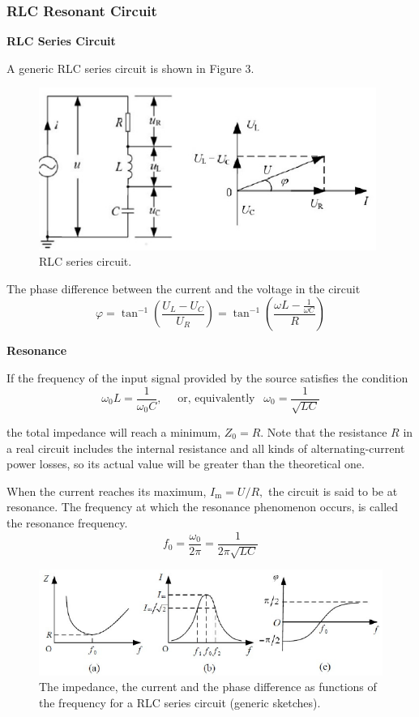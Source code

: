 \documentclass[12pt,a4paper]{article}
\begin{document}
\subsubsection{RLC Resonant Circuit}
\quad \textbf{RLC Series Circuit}\par
A generic RLC series circuit is shown in Figure 3. 
\begin{figure}[H]
	\centering
	\includegraphics[width=11cm]{3}
	\caption{RLC series circuit.}
	\label{fig:front}
\end{figure}
\par The phase difference between the current and the voltage in the circuit
$$
\varphi=\tan ^{-1}\left(\frac{U_{L}-U_{C}}{U_{R}}\right)=\tan ^{-1}\left(\frac{\omega L-\frac{1}{\omega C}}{R}\right)
$$

\textbf{Resonance}\par
If the frequency of the input signal provided by the source satisfies the condition
$$
\omega_{0} L=\frac{1}{\omega_{0} C}, \quad \text { or, equivalently } ~~\omega_{0}=\frac{1}{\sqrt{L C}}
$$
\par the total impedance will reach a minimum, $Z_{0}=R$. Note that the resistance $R$ in a real circuit includes the internal resistance and all kinds of alternating-current power losses, so its actual value will be greater than the theoretical one.

When the current reaches its maximum, $I_{\mathrm{m}}=U / R,$ the circuit is said to be at resonance. The frequency at which the resonance phenomenon occurs, is called the resonance frequency. 
$$
f_{0}=\frac{\omega_{0}}{2 \pi}=\frac{1}{2 \pi \sqrt{L C}}
$$
 
\begin{figure}[H]
	\centering
	\includegraphics[width=13cm]{4}
	\caption{The impedance, the current and the phase difference as functions of the frequency for a RLC series circuit (generic sketches).}
	\label{fig:front}
\end{figure}
\end{document}

